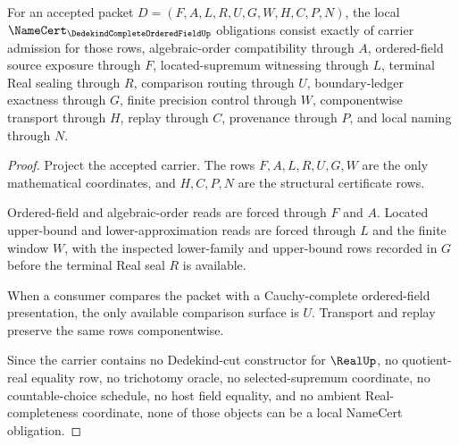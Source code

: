\begin{theorem}
\label{thm:dedekind-complete-ordered-field-namecert-obligations}
For an accepted packet $D=(F,A,L,R,U,G,W,H,C,P,N)$, the local $\NameCert_{\DedekindCompleteOrderedFieldUp}$ obligations consist exactly of carrier admission for those rows, algebraic-order compatibility through $A$, ordered-field source exposure through $F$, located-supremum witnessing through $L$, terminal Real sealing through $R$, comparison routing through $U$, boundary-ledger exactness through $G$, finite precision control through $W$, componentwise transport through $H$, replay through $C$, provenance through $P$, and local naming through $N$.
\end{theorem}
\begin{proof}
Project the accepted carrier. The rows $F,A,L,R,U,G,W$ are the only mathematical coordinates, and $H,C,P,N$ are the structural certificate rows.

Ordered-field and algebraic-order reads are forced through $F$ and $A$. Located upper-bound and lower-approximation reads are forced through $L$ and the finite window $W$, with the inspected lower-family and upper-bound rows recorded in $G$ before the terminal Real seal $R$ is available.

When a consumer compares the packet with a Cauchy-complete ordered-field presentation, the only available comparison surface is $U$. Transport and replay preserve the same rows componentwise.

Since the carrier contains no Dedekind-cut constructor for $\RealUp$, no quotient-real equality row, no trichotomy oracle, no selected-supremum coordinate, no countable-choice schedule, no host field equality, and no ambient Real-completeness coordinate, none of those objects can be a local NameCert obligation.
\end{proof}

